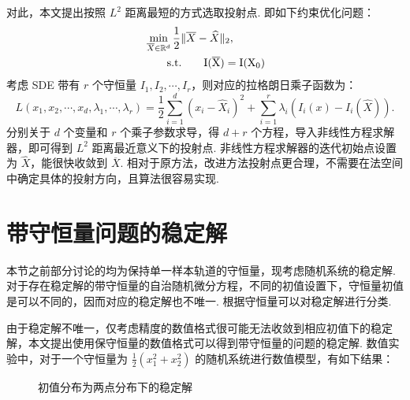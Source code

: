 对此，本文提出按照 $L^2$ 距离最短的方式选取投射点. 即如下约束优化问题：
\begin{equation}
	\begin{aligned}
	\begin{aligned}
	&\min _ {\overline X \in \mathbb{R}^d} \frac12 \| \overline X - \widehat X\|_2,\\
	&\qquad \rm{s.t.}\qquad  	I(\overline X) = I(X_0)
	\end{aligned}
	\end{aligned} 
\end{equation}
考虑 SDE 带有 $r$ 个守恒量 $I_1,I_2,\cdots,I_r$，则对应的拉格朗日乘子函数为：
\[
L(x_1,x_2,\cdots ,x_d,\lambda_1,\cdots,\lambda_r) = \frac12 \sum _{i=1}^{d} (x_i-\widehat X_i)^2 + \sum_{i=1}^r \lambda_i( I_i(x) - I_i(\widehat X)). 
\]
分别关于 $d$ 个变量和 $r$ 个乘子参数求导，得 $d+r$ 个方程，导入非线性方程求解器，即可得到 $L^2$ 距离最近意义下的投射点. 非线性方程求解器的迭代初始点设置为 $\widehat X$，能很快收敛到 $\overline X$. 
相对于原方法，改进方法投射点更合理，不需要在法空间中确定具体的投射方向，且算法很容易实现. 


\section{带守恒量问题的稳定解}
本节之前部分讨论的均为保持单一样本轨道的守恒量，现考虑随机系统的稳定解. 对于存在稳定解的带守恒量的自治随机微分方程，不同的初值设置下，守恒量初值是可以不同的，因而对应的稳定解也不唯一. 根据守恒量可以对稳定解进行分类. 

由于稳定解不唯一，仅考虑精度的数值格式很可能无法收敛到相应初值下的稳定解，本文提出使用保守恒量的数值格式可以得到带守恒量的问题的稳定解. 数值实验中，对于一个守恒量为 $\frac12(x_1^2+x_2^2)$ 的随机系统进行数值模型，有如下结果：


\begin{figure}[!htbp]
	\centering 
	\vspace{.2cm}
	\caption{初值分布为两点分布下的稳定解}
	\label{fig.5.2}
\end{figure}

